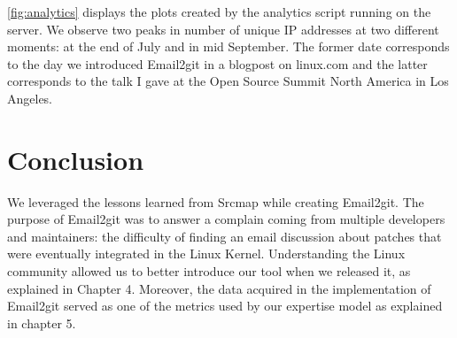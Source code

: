 \autoref{fig:analytics} displays the plots created by the analytics script running on the server. We observe two peaks in number of unique IP addresses at two different moments: at the end of July and in mid September. The former date corresponds to the day we introduced Email2git in a blogpost on linux.com and the latter corresponds to the talk I gave at the Open Source Summit North America in Los Angeles. 

\section{Conclusion}

We leveraged the lessons learned from Srcmap while creating Email2git. The purpose of Email2git was to answer a complain coming from multiple developers and maintainers: the difficulty of finding an email discussion about patches that were eventually integrated in the Linux Kernel. Understanding the Linux community allowed us to better introduce our tool when we released it, as explained in Chapter 4. Moreover, the data acquired in the implementation of Email2git served as one of the metrics used by our expertise model as explained in chapter 5.



